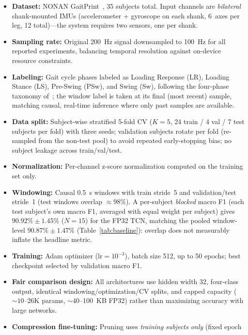 \documentclass[conference]{IEEEtran}
\begin{document}
\begin{itemize}
  \item \textbf{Dataset:} NONAN GaitPrint~\cite{ref7}, 35 subjects total. Input channels are
        \emph{bilateral} shank-mounted IMUs (accelerometer + gyroscope on each shank, 6~axes per
        leg, 12 total)---the system requires two sensors, one per shank.
  \item \textbf{Sampling rate:} Original 200~Hz signal downsampled to 100~Hz for all reported
        experiments, balancing temporal resolution against on-device resource constraints.
  \item \textbf{Labeling:} Gait cycle phases labeled as Loading Response (LR), Loading Stance (LS),
        Pre-Swing (PSw), and Swing (Sw), following the four-phase taxonomy of~\cite{ref1}; the
        window label is taken at its final (most recent) sample, matching causal, real-time
        inference where only past samples are available.
  \item \textbf{Data split:} Subject-wise stratified 5-fold CV ($K{=}5$, 24 train / 4 val / 7 test
        subjects per fold) with three seeds; validation subjects rotate per fold (re-sampled from
        the non-test pool) to avoid repeated early-stopping bias; no subject leakage across
        train/val/test.
  \item \textbf{Normalization:} Per-channel z-score normalization computed on the training set only.
  \item \textbf{Windowing:} Causal 0.5~s windows with train stride~5 and validation/test stride~1
        (test windows overlap $\approx$98\%). A per-subject \emph{blocked} macro F1 (each test
        subject's own macro F1, averaged with equal weight per subject) gives $90.92\%\pm1.45\%$
        ($N{=}15$) for the FP32 TCN, matching the pooled window-level $90.87\%\pm1.47\%$
        (Table~\ref{tab:baseline}): overlap does not measurably inflate the headline metric.
  \item \textbf{Training:} Adam optimizer ($\mathrm{lr}=10^{-3}$), batch size 512, up to 50 epochs;
        best checkpoint selected by validation macro F1.
  \item \textbf{Fair comparison design:} All architectures use hidden width 32, four-class output,
        identical windowing/optimization/CV splits, and capped capacity (${\sim}10$--26K params,
        ${\sim}40$--100~KB FP32) rather than maximizing accuracy with large networks.
  \item \textbf{Compression fine-tuning:} Pruning uses \emph{training subjects only} (fixed epoch

\end{itemize}
\end{document}
